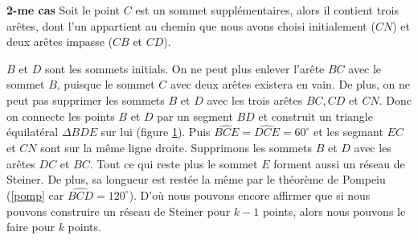 \documentclass[10pt,a4paper]{article}%
\theoremstyle{theorem}
\theoremstyle{definition}
\begin{document}
        		\textbf{2-me cas} Soit le point $C$ est un sommet supplémentaires, alors il contient trois arêtes, dont l'un appartient au chemin que nous avons choisi initialement ($CN$) et deux arêtes impasse ($CB$ et $CD$).
        		
        		\begin{figure}[h]
        			\begin{center}
        		\end{center}
        		\caption{}\label{reseau2}
        		\end{figure}
        		
        		$B$ et $D$ sont les sommets initials. On ne peut plus enlever l'arête $BC$ avec le sommet $B$, puisque le sommet $C$ avec deux arêtes existera en vain. De plus, on ne peut pas supprimer les sommets $B$ et $D$ avec les trois arêtes $BC, CD$ et $CN$. Donc on connecte les points $B$ et $D$ par un segment $BD$ et construit un triangle équilatéral $\Delta BDE$ sur lui (figure \ref{reseau2}). Puis  $\widehat{BCE}=\widehat{DCE}=60^\circ$ et les segmant $EC$ et $CN$ sont sur la même ligne droite. Supprimons les sommets $B$ et $D$ avec les arêtes $DC$ et $BC$. Tout ce qui reste plus le sommet $E$ forment aussi un réseau de Steiner. De plus, sa longueur est restée la même par le théorème de Pompeiu (\ref{pomp} car $\widehat{BCD}=120^\circ$). D'où nous pouvons encore affirmer que si nous pouvons construire un réseau de Steiner pour $k-1$ points, alors nous pouvons le faire pour $k$ points.
        		
\end{document}
